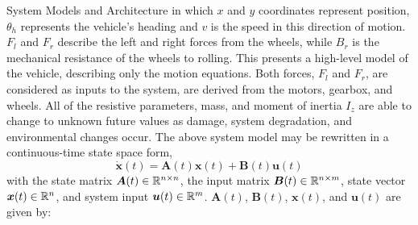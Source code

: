 \begin{section}{System Models and Architecture}
in which $x$ and $y$ coordinates represent position, $\theta_h$ represents the vehicle's heading
 and $v$ is the speed in this direction of motion. $F_l$ and $F_r$ describe the left and right forces from the wheels, while $B_r$ is the mechanical resistance of the wheels to rolling. 
This presents a high-level model of the vehicle, describing only the motion equations. Both forces, $F_l$ and $F_r$, are considered as inputs to the system, are derived from the motors, gearbox, and wheels. All of the resistive parameters, mass, and moment of inertia $I_z$ are able to change to unknown future values as damage, system degradation, and environmental changes occur. The above system model may be rewritten in a continuous-time state space form,
    \begin{equation}
	\dot{\bm{x}}(t) = \bm{A}(t)\bm{x}(t) + \bm{B}(t)\bm{u}(t)
	\end{equation}
with the state matrix $\bm{A}(t) \in \mathbb{R}^{n\times n}$, the input matrix $\bm{B}(t) \in \mathbb{R}^{n\times m}$, state vector $\bm{x}(t) \in \mathbb{R}^{n}$, and system input $\bm{u}(t) \in \mathbb{R}^{m}$. $\bm{A}(t)$, $\bm{B}(t)$, $\bm{x}(t)$, and $\bm{u}(t)$ are given by:


\end{section}
